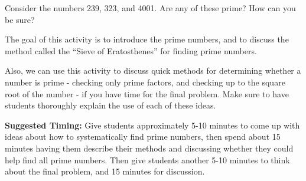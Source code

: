 \documentclass{ximera}
\begin{document}
\begin{problem}
Consider the numbers 239, 323, and 4001. Are any of these prime? How
can you be sure?
\end{problem}


\newpage
\begin{instructorNotes}
The goal of this activity is to introduce the prime numbers, and to discuss the method called the ``Sieve of Eratosthenes'' for finding prime numbers.

Also, we can use this activity to discuss quick methods for determining whether a number is prime - checking only prime factors, and checking up to the square root of the number - if you have time for the final problem.  Make sure to have students thoroughly explain the use of each of these ideas.

{\bf Suggested Timing:} Give students approximately 5-10 minutes to come up with ideas about how to systematically find prime numbers, then spend about 15 minutes having them describe their methods and discussing whether they could help find all prime numbers.  Then give students another 5-10 minutes to think about the final problem, and 15 minutes for discussion.
\end{instructorNotes}
\end{document}

